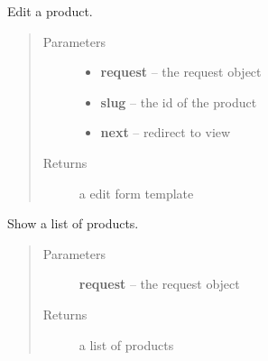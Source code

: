 \documentclass[letterpaper,10pt,english]{sphinxmanual}
\begin{document}
\begin{fulllineitems}
\label{api/system:limeade.system.views.product_edit}
Edit a product.
\begin{quote}\begin{description}
\item[{Parameters}] \leavevmode\begin{itemize}
\item {} 
\textbf{request} -- the request object

\item {} 
\textbf{slug} -- the id of the product

\item {} 
\textbf{next} -- redirect to view

\end{itemize}

\item[{Returns}] \leavevmode
a edit form template

\end{description}\end{quote}

\end{fulllineitems}


\begin{fulllineitems}
\label{api/system:limeade.system.views.product_list}
Show a list of products.
\begin{quote}\begin{description}
\item[{Parameters}] \leavevmode
\textbf{request} -- the request object

\item[{Returns}] \leavevmode
a list of products

\end{description}\end{quote}

\end{fulllineitems}

\end{document}
